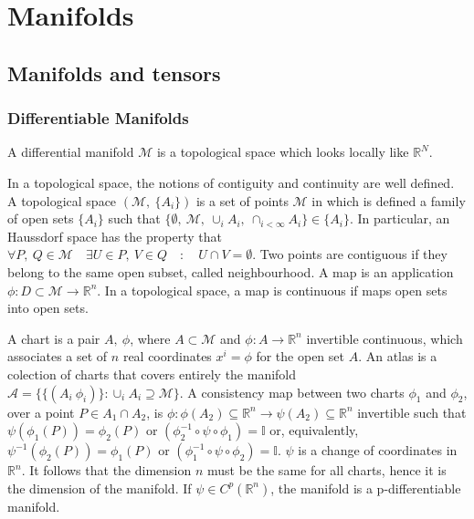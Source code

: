 \part{Manifolds}

\chapter{Manifolds and tensors}

\section{Differentiable Manifolds}

    A differential manifold $\mathcal M$ is a topological space which looks locally like $\mathbb R^N$.

    In a topological space, the notions of contiguity and continuity are well defined. A topological space $(\mathcal M, ~\{A_i\})$ is a set of points $\mathcal M$ in which is defined a family of open sets $\{A_i\}$ such that $\{ \emptyset, ~\mathcal M, ~ \cup_i A_i, ~ \cap_{i < \infty} A_i\} \in \{A_i\}$. In particular, an Haussdorf space has the property that $\forall P, ~Q \in \mathcal M \quad \exists U \in P, ~V \in Q \quad \colon \quad U \cap V = \emptyset$. Two points are contiguous if they belong to the same open subset, called neighbourhood. A map is an application $\phi \colon D \subset \mathcal M \rightarrow \mathbb R^n$. In a topological space, a map is continuous if maps open sets into open sets. 

    A chart is a pair $A, ~\phi$, where $A \subset \mathcal M$ and $\phi \colon A \rightarrow \mathbb R^n$ invertible continuous, which associates a set of $n$ real coordinates $x^i = \phi$ for the open set $A$. An atlas is a colection of charts that covers entirely the manifold $\mathcal A = \{\{(A_i ~\phi_i)\} \colon \cup_i A_i \supseteq \mathcal M \} $. A consistency map between two charts $\phi_1$ and $\phi_2$, over a point $P \in A_1 \cap A_2$, is $\phi \colon \phi(A_2) \subseteq \mathbb R^n \rightarrow \psi(A_2) \subseteq \mathbb R^n $ invertible such that $\psi(\phi_1(P)) = \phi_2(P)$ or $(\phi_2^{-1} \circ \psi \circ \phi_1) = \mathbb I$ or, equivalently, $\psi^{-1} (\phi_2(P)) = \phi_1(P)$ or $(\phi_1^{-1} \circ \psi \circ \phi_2) = \mathbb I$. $\psi$ is a change of coordinates in $\mathbb R^n$. It follows that the dimension $n$ must be the same for all charts, hence it is the dimension of the manifold. If $\psi \in C^p(\mathbb R^n)$, the manifold is a p-differentiable manifold.

